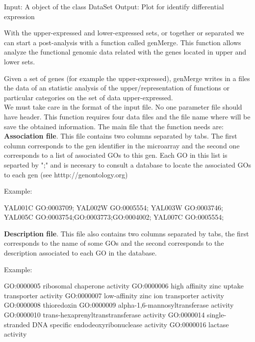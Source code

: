 \documentclass[12pt]{article}
\begin{document}
\begin{Soutput}
Input: A object of the class DataSet
Output: Plot for identify differential expression
\end{Soutput}

With the upper-expressed and lower-expressed sets, or together or separated we can start a post-analysis with a function called genMerge. This function allows analyze the functional genomic data related with the genes located in upper and lower sets.

Given a set of genes (for example the upper-expressed), genMerge writes in a files the data of an statistic analysis of the upper/representation of functions or particular categories on the set of data upper-expressed.\\

We must take care in the format of the input file. No one parameter file should have header. This function requires four data files and the file name where will be save the obtained information. The main file that the function needs are:\\
\textbf{Association file}. This file contains two columns separated by tabs. The first column corresponds to the gen identifier in the microarray and the second one corresponds to a list of associated GOs to this gen. Each GO in this list is separted by ";" and is necesary to consult a database to locate the associated GOs to each gen (see htttp://genontology.org)
\begin{Scode}
Example:

YAL001C GO:0003709;
YAL002W GO:0005554;
YAL003W GO:0003746;
YAL005C GO:0003754;GO:0003773;GO:0004002;
YAL007C GO:0005554;
\end{Scode}

\textbf{Description file}. This file also contains two columns separated by tabs, the first corresponds to the name of some GOs and the second corresponds to the description associated to each GO in the database.
\begin{Scode}
Example:

GO:0000005      ribosomal chaperone activity
GO:0000006      high affinity zinc uptake transporter activity
GO:0000007      low-affinity zinc ion transporter activity
GO:0000008      thioredoxin
GO:0000009      alpha-1,6-mannosyltransferase activity
GO:0000010      trans-hexaprenyltranstransferase activity
GO:0000014      single-stranded DNA specific endodeoxyribonuclease activity
GO:0000016      lactase activity
\end{Scode}
\end{document}
